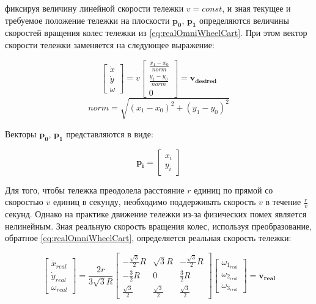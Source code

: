\documentclass[oneside,final,14pt]{extreport}
\newcommand{\bs}{\boldsymbol}
\begin{document}
фиксируя величину линейной скорости тележки $v = const$, и зная текущее и требуемое положение тележки на плоскости $\bs{p_0}$, $\bs{p_1}$ определяются величины скоростей вращения колес тележки из \ref{eq:realOmniWheelCart}. При этом  вектор скорости тележки заменяется на следующее выражение:

\begin{equation}
\begin{bmatrix}
\dot{x} \\
\dot{y} \\
\omega
\end{bmatrix}
=
v
\begin{bmatrix}
\frac{x_1 - x_0}{norm} \\
\frac{y_1 - y_0}{norm} \\
0
\end{bmatrix}
=
\bs{v_{desired}}
\end{equation}
\begin{equation}
norm = \sqrt{(x_1 - x_0)^2 + (y_1 -y_0)^2}
\end{equation}

Векторы $\bs{p_0}$, $\bs{p_1}$ представляются в виде:

\begin{equation}
\bs{p_i} 
= 
\begin{bmatrix}
x_i
\\
y_i
\end{bmatrix} 
\end{equation}

Для того, чтобы тележка преодолела расстояние $r$ единиц  по прямой  со скоростью $v$ единиц в секунду, необходимо поддерживать скорость $v$  в течение $\frac{r}{v}$ секунд. Однако на практике движение тележки из-за физических помех является нелинейным. Зная реальную скорость вращения колес, используя преобразование, обратное \ref{eq:realOmniWheelCart}, определяется реальная скорость тележки:

\begin{equation}
\label{eq:reverseRealOmniWheelCart}
\begin{bmatrix}
\dot{x}_{real} \\
\dot{y}_{real} \\
\omega_{real}
\end{bmatrix}
=
\frac{2r}{3 \sqrt{3} R }
\begin{bmatrix}
-\frac{\sqrt{3}}{2} R &
 \sqrt{3}  R&
-\frac{\sqrt{3}}{2} R
\\
- \frac{3}{2} R&
0 &
 \frac{3}{2} R
\\
\frac{\sqrt{3}}{2} &
\frac{\sqrt{3}}{2} &
\frac{\sqrt{3}}{2}
\end{bmatrix}
\begin{bmatrix}
\omega_{1_{real}} \\
\omega_{2_{real}} \\
\omega_{3_{real}}
\end{bmatrix}
=
\bs{v_{real}}
\end{equation}
\end{document}
